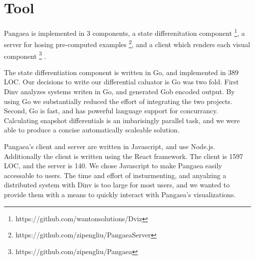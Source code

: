\section{Tool}
\label{sec:tool}

Pangaea is implemented in 3 components, a state differenitation
component \footnote{https://github.com/wantonsolutions/Dviz}, a server
for hosing pre-computed examples
\footnote{https://github.com/zipengliu/PangaeaServer}, and a client
which renders each visual component
\footnote{https://github.com/zipengliu/Pangaea} .

The state differentiation component is written in Go, and implemented
in 389 LOC. Our decisions to write our differential caluator is Go was
two fold. First Dinv analyzes systems writen in Go, and generated Gob
encoded output. By using Go we substantially reduced the effort of
integrating the two projects. Second, Go is fast, and has powerful
language support for concurrancy. Calculating snapshot differentials
is an imbarisingly parallel task, and we were able to produce a
concise automatically scaleable solution.

Pangaea's client and server are written in Javascript, and use
Node.js. Additionally the client is written using the React framework.
The client is 1597 LOC, and the server is 140. We chose Javascript to
make Pangaea easily accessable to users. The time and effort of
insturmenting, and anyalzing a distributed system with Dinv is too
large for most users, and we wanted to provide them with a means to
quickly interact with Pangaea's visualizations.


